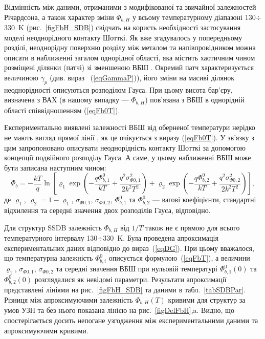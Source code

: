 Відмінність між даними, отриманими з модифікованої та звичайної залежностей Річардсона,
а також характер зміни $\Phi_{b,H}$ у всьому температурному діапазоні 130$\div$330~K (рис.~\ref{figFbH_SDB})
свідчать на користь необхідності застосування моделі неоднорідного контакту Шотткі.
Як вже згадувалось у попередньому розділі,
неоднорідну поверхню розділу між металом та напівпровідником можна описати в наближенні загалом однорідної області,
яка містить хаотичним чином розміщені ділянки (патчі) зі зменшеною ВБШ \cite{Tung:PhysRev,Tung:MSE}.
Окремий патч характеризується величиною $\gamma_p$ (див. вираз ~(\ref{eqGammaP})),
його зміни на масиві ділянок неоднорідності описуються розподілом Гауса.
При цьому висота бар'єру, визначена з ВАХ (в нашому випадку --- $\Phi_{b,H}$) пов'язана з ВБШ в однорідній області співвідношенням (\ref{eqFb0T}).

 Експериментально виявлені залежності ВБШ від оберненої температури нерідко не мають вигляд прямої лінії \cite{KumarJAP2012,Tascioglu2010,Jiang:DG,Yildirima:DG,Jiang:DGJap},
як це очікується з виразу (\ref{eqFb0T}).
У зв'язку з цим запропоновано \cite{Jiang:DG,Yildirima:DG,Jiang:DGJap} описувати неоднорідність контакту Шотткі за допомогою концепції подвійного розподілу Гауса.
А саме, у цьому наближенні ВБШ може бути записана наступним чином:
\begin{equation}
\label{eqDG}
  \Phi_b=-\frac{kT}{q}\ln\left[\varrho_1\exp\left(-\frac{q\Phi_{b,1}^0}{kT}+
  \frac{q^2\sigma^2_{\Phi0,1}}{2k^2T^2}\right)
   +
  \varrho_2\exp\left(-\frac{q\Phi_{b,2}^{0}}{kT}+
  \frac{q^2\sigma^2_{\Phi0,2}}{2k^2T^2}\right)\right],
\end{equation}
де
$\varrho_1$, $\varrho_2=1-\varrho_1$, $\sigma_{\Phi0,1}$, $\sigma_{\Phi0,2}$, $\Phi_{b,1}^0$ та $\Phi_{b,2}^0$ ---
вагові коефіцієнти, стандартні відхилення та середні значення двох розподілів Гауса, відповідно.

Для структур SSDB залежність $\Phi_{b,H}$ від $1/T$ також не є прямою для всього температурного інтервалу 130$\div$330~K.
Була проведена апроксимація експериментальних даних відповідно до вираз~(\ref{eqDG}).
При цьому вважалося, що температурна залежність $\Phi_{b,i}^0$ описується формулою~(\ref{eqFbT}), а величини
$\varrho_1$, $\sigma_{\Phi0,1}$, $\sigma_{\Phi0,2}$ та середні значення ВБШ при нульовій температурі $\Phi_{b,1}^0(0)$ та $\Phi_{b,2}^0(0)$
розглядалися як невідомі параметри.
Результати апроксимації представлені лініями на рис.~\ref{figFbH_SDB} та даними в табл.~\ref{tabSDBPar}.
Різниця між апроксимуючими залежність $\Phi_{b,H}(T)$ кривими для структур за умов УЗН та без нього
показана лінією на рис.~\ref{figDelFbH},a.
Видно, що спостерігається досить непогане узгодження між експериментальними даними та апроксимуючими кривими.

